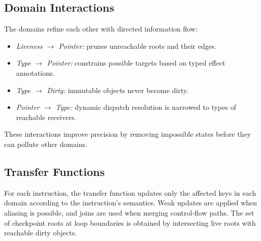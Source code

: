 
\subsection{Domain Interactions}
The domains refine each other with directed information flow:
\begin{itemize}
    \item \emph{Liveness $\rightarrow$ Pointer:} prunes unreachable roots and their edges.
    \item \emph{Type $\rightarrow$ Pointer:} constrains possible targets based on typed effect annotations.
    \item \emph{Type $\rightarrow$ Dirty:} immutable objects never become dirty.
    \item \emph{Pointer $\rightarrow$ Type:} dynamic dispatch resolution is narrowed to types of reachable receivers.
\end{itemize}
These interactions improve precision by removing impossible states before they can pollute other domains.

\subsection{Transfer Functions}
For each instruction, the transfer function updates only the affected keys in each domain according to the instruction's semantics.
Weak updates are applied when aliasing is possible, and joins are used when merging control-flow paths.
The set of checkpoint roots at loop boundaries is obtained by intersecting live roots with reachable dirty objects.
